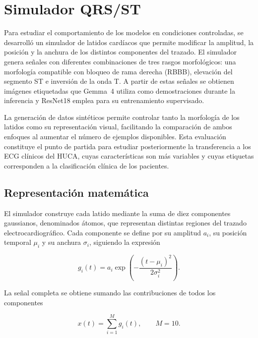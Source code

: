 \section{Simulador QRS/ST}
\label{chap:simulador}

Para estudiar el comportamiento de los modelos en condiciones controladas, se desarrolló un simulador de latidos cardíacos que permite modificar la amplitud, la posición y la anchura de los distintos componentes del trazado. El simulador genera señales con diferentes combinaciones de tres rasgos morfológicos: una morfología compatible con bloqueo de rama derecha (RBBB), elevación del segmento ST e inversión de la onda T. A partir de estas señales se obtienen imágenes etiquetadas que Gemma~4 utiliza como demostraciones durante la inferencia y ResNet18 emplea para su entrenamiento supervisado.

La generación de datos sintéticos permite controlar tanto la morfología de los latidos como su representación visual, facilitando la comparación de ambos enfoques al aumentar el número de ejemplos disponibles. Esta evaluación constituye el punto de partida para estudiar posteriormente la transferencia a los ECG clínicos del HUCA, cuyas características son más variables y cuyas etiquetas corresponden a la clasificación clínica de los pacientes.

\subsection{Representación matemática}

El simulador construye cada latido mediante la suma de diez componentes gaussianos, denominados átomos, que representan distintas regiones del trazado electrocardiográfico. Cada componente se define por su amplitud \(a_i\), su posición temporal \(\mu_i\) y su anchura \(\sigma_i\), siguiendo la expresión

\begin{equation}
g_i(t) =
a_i
\exp
\left(
-\frac{(t-\mu_i)^2}{2\sigma_i^2}
\right).
\label{eq:gaussian_atom_sim}
\end{equation}
\label{eq:gaussian_atom}

La señal completa se obtiene sumando las contribuciones de todos los componentes

\begin{equation}
x(t) =
\sum_{i=1}^{M} g_i(t), \qquad M=10.
\label{eq:sum_gaussians}
\end{equation}
\label{eq:gaussian_sum}


